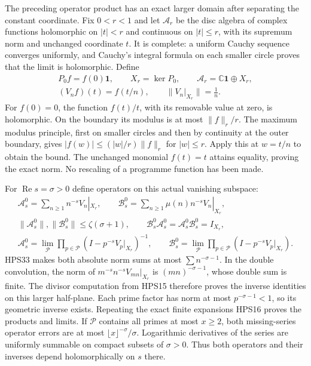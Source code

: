The preceding operator product has an exact larger
domain after separating the constant coordinate.
Fix $0<r<1$ and let $\mathcal A_r$ be the disc
algebra of complex functions holomorphic on
$|t|<r$ and continuous on $|t|\le r$, with its
supremum norm and unchanged coordinate $t$.
It is complete: a uniform Cauchy sequence
converges uniformly, and Cauchy's integral
formula on each smaller circle proves that
the limit is holomorphic. Define
\begin{equation}\tag{HPS33}
\begin{gathered}
 P_0f=f(0)\mathbf1,\qquad X_r=\ker P_0,\qquad
 \mathcal A_r=\mathbb C\mathbf1\oplus X_r,\\
 (V_nf)(t)=f(t/n),\qquad
 \|V_n|_{X_r}\|=\frac1n .
\end{gathered}
\end{equation}
For $f(0)=0$, the function $f(t)/t$, with
its removable value at zero, is holomorphic.
On the boundary its modulus is at most
$\|f\|_r/r$. The maximum modulus principle,
first on smaller circles and then by
continuity at the outer boundary, gives
$|f(w)|\le(|w|/r)\|f\|_r$ for $|w|\le r$.
Apply this at $w=t/n$ to obtain the bound.
The unchanged monomial $f(t)=t$ attains
equality, proving the exact norm.
No rescaling of a programme function
has been made.

For $\operatorname{Re}s=\sigma>0$ define
operators on this actual vanishing subspace:
\begin{equation}\tag{HPS34}
\begin{gathered}
 \mathcal A_s^0=\sum_{n\ge1}n^{-s}V_n|_{X_r},\qquad
 \mathcal B_s^0=\sum_{n\ge1}\mu(n)n^{-s}V_n|_{X_r},\\
 \|\mathcal A_s^0\|,\|\mathcal B_s^0\|
                                  \le\zeta(\sigma+1),\qquad
 \mathcal B_s^0\mathcal A_s^0
          =\mathcal A_s^0\mathcal B_s^0=I_{X_r},\\
 \mathcal A_s^0
   =\lim_{\mathcal P}\prod_{p\in\mathcal P}
             (I-p^{-s}V_p|_{X_r})^{-1},\qquad
 \mathcal B_s^0
   =\lim_{\mathcal P}\prod_{p\in\mathcal P}
             (I-p^{-s}V_p|_{X_r}).
\end{gathered}
\end{equation}
HPS33 makes both absolute norm sums at most
$\sum n^{-\sigma-1}$. In the double
convolution, the norm of
$m^{-s}n^{-s}V_{mn}|_{X_r}$ is
$(mn)^{-\sigma-1}$, whose double sum is
finite. The divisor computation from
HPS15 therefore proves the inverse
identities on this larger half-plane.
Each prime factor has norm at most
$p^{-\sigma-1}<1$, so its geometric
inverse exists. Repeating the exact
finite expansions HPS16 proves the
products and limits. If $\mathcal P$
contains all primes at most $x\ge2$,
both missing-series operator errors
are at most
$\lfloor x\rfloor^{-\sigma}/\sigma$.
Logarithmic derivatives of the series
are uniformly summable on compact
subsets of $\sigma>0$. Thus both
operators and their inverses depend
holomorphically on $s$ there.

